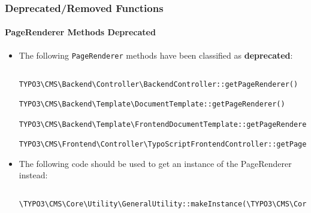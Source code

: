 \begin{frame}[fragile]
\begin{itemize}
	\end{itemize}

\end{frame}


\begin{frame}[fragile]
	\frametitle{Deprecated/Removed Functions}
	\framesubtitle{PageRenderer Methods Deprecated}

	\lstset{basicstyle=\tiny\ttfamily}

	\begin{itemize}
		\item The following \texttt{PageRenderer} methods have been classified as \textbf{deprecated}:

			\begin{lstlisting}
				TYPO3\CMS\Backend\Controller\BackendController::getPageRenderer()
				TYPO3\CMS\Backend\Template\DocumentTemplate::getPageRenderer()
				TYPO3\CMS\Backend\Template\FrontendDocumentTemplate::getPageRenderer()
				TYPO3\CMS\Frontend\Controller\TypoScriptFrontendController::getPageRenderer()
			\end{lstlisting}

		\item The following code should be used to get an instance of the PageRenderer instead:

			\begin{lstlisting}
				\TYPO3\CMS\Core\Utility\GeneralUtility::makeInstance(\TYPO3\CMS\Core\Page\PageRenderer::class)
			\end{lstlisting}

	\end{itemize}

\end{frame}


